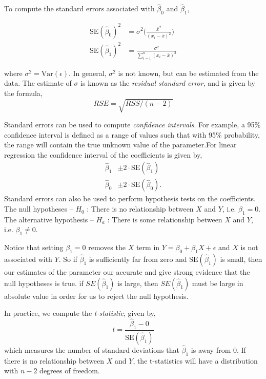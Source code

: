 \documentclass{article}
\numberwithin{equation}{section}
\begin{document}
To compute the standard errors associated with $\hat \beta_0$ and $\hat \beta_1$,

\begin{align*}
    \text{SE} ( \hat \beta_0 )^2 &= \sigma^2 \Bigg (  \frac{\bar x^2}{(x_i - \bar x)^2}  \Bigg )\\ 
    \text{SE} ( \hat \beta_1 )^2 &= \frac{\sigma^2}{\sum_{i=1}^n (x_i - \bar x)^2} 
\end{align*}

where $\sigma^2 = \text{Var}(\epsilon)$. In general, $\sigma^2$ is not known, but can be estimated from the data. The estimate of $\sigma$ is known as the \textit{residual standard error}, and is given by the formula,
\begin{equation}\label{eq:RSE-1}
    RSE = \sqrt{RSS/(n - 2)}
\end{equation}

Standard errors can be used to compute \textit{confidence intervals}. For example, a  95\% confidence interval is defined as a range of values such that with  95\% probability, the range will contain the true unknown value of the parameter.For linear regression the confidence interval of the coefficients is given by,
\begin{align*}
    \hat \beta_1 &\pm 2 \cdot \text{SE}(\hat \beta_1)  \\
    \hat \beta_0 &\pm 2 \cdot \text{SE}(\hat \beta_0).
\end{align*}
Standard errors can also be used to perform hypothesis tests on the coefficients. The null hypotheses --  $H_0$ : There is no relationship between $X$ and $Y$, i.e. $\beta_1 = 0$. The alternative hypothesis -- $H_a$ : There is some relationship between $X$ and $Y$, i.e. $\beta_1 \neq 0$. 

Notice that setting $\beta_1 = 0$ removes the $X$ term in $Y = \beta_0 + \beta_1 X + \epsilon$ and $X$ is not associated with $Y$. So if $\hat \beta_1$ is sufficiently far from zero and $\text{SE}(\hat \beta_1)$ is small, then our estimates of the parameter our accurate and give strong evidence that the null hypotheses is true. if $SE(\hat\beta_1)$ is large, then $SE(\hat\beta_1)$ must be large in absolute value in order for us to reject the null hypothesis.

In practice, we compute the \textit{t-statistic}, given by,
\begin{equation}
    t = \frac{\hat \beta_1 - 0}{\text{SE}(\hat \beta_1)}
\end{equation}
which measures the number of standard deviations that $\hat \beta_1$ is away from 0. If there is no relationship between $X$ and $Y$, the t-statistics will have a distribution with $n - 2$ degrees of freedom. 
\end{document}
